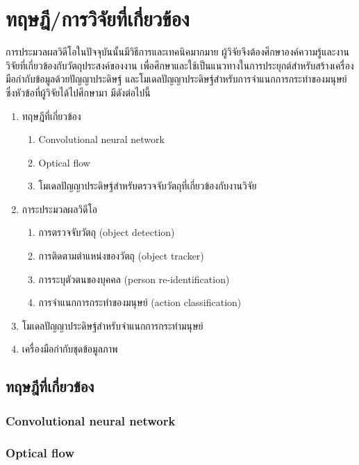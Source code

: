 \clearpage
\chapter{ทฤษฎี/การวิจัยที่เกี่ยวข้อง}
การประมวลผลวิดีโอในปัจจุบันนั้นมีวิธีการและเทคนิคมากมาย ผู้วิจัยจึงต้องศึกษาองค์ความรู้และงานวิจัยที่เกี่ยวข้องกับวัตถุประสงค์ของงาน 
เพื่อศึกษาและใช้เป็นแนวทางในการประยุกต์สำหรับสร้างเครื่องมือกำกับข้อมูลด้วยปัญญาประดิษฐ์ และโมเดลปัญญาประดิษฐ์สำหรับการจำแนกการกระทำของมนุษย์ 
ซึ่งหัวข้อที่ผู้วิจัยได้ไปศึกษามา มีดังต่อไปนี้
\begin{enumerate}
	\setlength\itemsep{-0.25em}
	\item ทฤษฎีที่เกี่ยวข้อง
	\begin{enumerate}
		\item Convolutional neural network
		\item Optical flow
		\item โมเดลปัญญาประดิษฐ์สำหรับตรวจจับวัตถุที่เกี่ยวข้องกับงานวิจัย
	\end{enumerate}
	\item การะประมวลผลวิดีโอ
	\begin{enumerate}	
		\item การตรวจจับวัตถุ (object detection)
		\item การติดตามตำแหน่งของวัตถุ (object tracker)
		\item การระบุตัวตนของบุคคล (person re-identification)
		\item การจำแนกการกระทำของมนุษย์ (action classification)
	\end{enumerate}
	\item โมเดลปัญญาประดิษฐ์สำหรับจำแนกการกระทำมนุษย์
	\item เครื่องมือกำกับชุดข้อมูลภาพ
\end{enumerate}
\clearpage

\section{ทฤษฎีที่เกี่ยวข้อง}
\subsection{Convolutional neural network}

\clearpage

\subsection{Optical flow}

\clearpage

